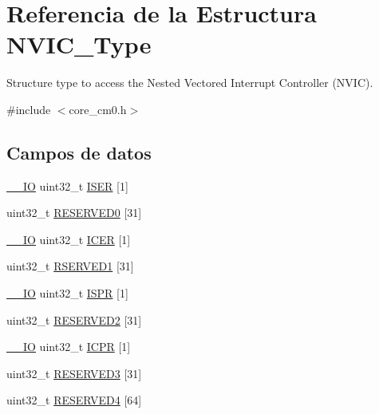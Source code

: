 \hypertarget{struct_n_v_i_c___type}{}\section{Referencia de la Estructura N\+V\+I\+C\+\_\+\+Type}
\label{struct_n_v_i_c___type}


Structure type to access the Nested Vectored Interrupt Controller (N\+V\+IC).  




{\ttfamily \#include $<$core\+\_\+cm0.\+h$>$}

\subsection*{Campos de datos}
\begin{DoxyCompactItemize}
\item 
\hyperlink{core__sc300_8h_aec43007d9998a0a0e01faede4133d6be}{\+\_\+\+\_\+\+IO} uint32\+\_\+t \hyperlink{struct_n_v_i_c___type_a95686b1da7037feece357d91ba5f5325}{I\+S\+ER} \mbox{[}1\mbox{]}
\item 
uint32\+\_\+t \hyperlink{struct_n_v_i_c___type_a148e6e212dc15628998e8f4239290665}{R\+E\+S\+E\+R\+V\+E\+D0} \mbox{[}31\mbox{]}
\item 
\hyperlink{core__sc300_8h_aec43007d9998a0a0e01faede4133d6be}{\+\_\+\+\_\+\+IO} uint32\+\_\+t \hyperlink{struct_n_v_i_c___type_a5524644c804c18c22addd691d4da53e4}{I\+C\+ER} \mbox{[}1\mbox{]}
\item 
uint32\+\_\+t \hyperlink{struct_n_v_i_c___type_a62ae13b33cd85ec43b6f84d85b7ea9c6}{R\+S\+E\+R\+V\+E\+D1} \mbox{[}31\mbox{]}
\item 
\hyperlink{core__sc300_8h_aec43007d9998a0a0e01faede4133d6be}{\+\_\+\+\_\+\+IO} uint32\+\_\+t \hyperlink{struct_n_v_i_c___type_ae3434eff1b1db4ce857c73a4ef1af273}{I\+S\+PR} \mbox{[}1\mbox{]}
\item 
uint32\+\_\+t \hyperlink{struct_n_v_i_c___type_a6e578ce633e8b80c70bc612a1bf8a965}{R\+E\+S\+E\+R\+V\+E\+D2} \mbox{[}31\mbox{]}
\item 
\hyperlink{core__sc300_8h_aec43007d9998a0a0e01faede4133d6be}{\+\_\+\+\_\+\+IO} uint32\+\_\+t \hyperlink{struct_n_v_i_c___type_a281c819da5f0f4265f5b88d269544bc9}{I\+C\+PR} \mbox{[}1\mbox{]}
\item 
uint32\+\_\+t \hyperlink{struct_n_v_i_c___type_afbefcd166e59396eadde34d46bfc4539}{R\+E\+S\+E\+R\+V\+E\+D3} \mbox{[}31\mbox{]}
\item 
uint32\+\_\+t \hyperlink{struct_n_v_i_c___type_aaed8c9afc755176cd51954c3056cc446}{R\+E\+S\+E\+R\+V\+E\+D4} \mbox{[}64\mbox{]}

\end{DoxyCompactItemize}
